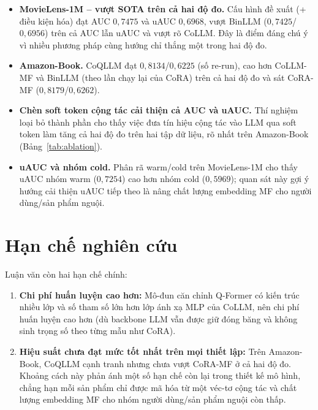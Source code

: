 \begin{itemize}
    \item \textbf{MovieLens-1M -- vượt SOTA trên cả hai độ đo.} Cấu hình đề xuất
    (+ điều kiện hóa) đạt AUC $0{,}7475$ và uAUC $0{,}6968$, vượt BinLLM
    ($0{,}7425$/$0{,}6956$) trên cả AUC lẫn uAUC và vượt rõ CoLLM. Đây là điểm đáng chú ý
    vì nhiều phương pháp cùng hướng chỉ thắng một trong hai độ đo.

    \item \textbf{Amazon-Book.} CoQLLM đạt $0{,}8134$/$0{,}6225$ (số re-run), cao hơn CoLLM-MF và
    BinLLM (theo lần chạy lại của CoRA) trên cả hai độ đo và sát CoRA-MF ($0{,}8179$/$0{,}6262$).

    \item \textbf{Chèn soft token cộng tác cải thiện cả AUC và uAUC.} Thí nghiệm loại bỏ thành
    phần cho thấy việc đưa tín hiệu cộng tác vào LLM qua soft token làm tăng cả hai độ đo trên hai
    tập dữ liệu, rõ nhất trên Amazon-Book (Bảng~\ref{tab:ablation}).

    \item \textbf{uAUC và nhóm cold.} Phân rã warm/cold trên MovieLens-1M cho thấy uAUC nhóm
    warm ($0{,}7254$) cao hơn nhóm cold ($0{,}5969$); quan sát này gợi ý hướng cải thiện uAUC
    tiếp theo là nâng chất lượng embedding MF cho người dùng/sản phẩm nguội.
\end{itemize}

\section{Hạn chế nghiên cứu}
\label{sec:han-che-ch5}

Luận văn còn hai hạn chế chính:

\begin{enumerate}
    \item \textbf{Chi phí huấn luyện cao hơn:} Mô-đun căn chỉnh Q-Former có kiến trúc nhiều lớp
    và số tham số lớn hơn lớp ánh xạ MLP của CoLLM, nên chi phí huấn luyện cao hơn (dù backbone
    LLM vẫn được giữ đóng băng và không sinh trọng số theo từng mẫu như CoRA).

    \item \textbf{Hiệu suất chưa đạt mức tốt nhất trên mọi thiết lập:} Trên Amazon-Book, CoQLLM
    cạnh tranh nhưng chưa vượt CoRA-MF ở cả hai độ đo. Khoảng cách này phản ánh một số hạn chế
    còn lại trong thiết kế mô hình, chẳng hạn mỗi sản phẩm chỉ được mã hóa từ một véc-tơ cộng tác
    và chất lượng embedding MF cho nhóm người dùng/sản phẩm nguội còn thấp.
\end{enumerate}

